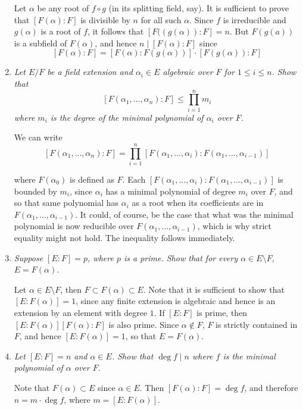 \documentclass[10pt]{article}
\begin{document}
\begin{enumerate}
Let $\alpha$ be any root of $f \circ g$ (in its splitting field, say).  It is sufficient to prove that $[F(\alpha):F]$ is divisible by $n$ for all such $\alpha$.  Since $f$ is irreducible and $g(\alpha)$ is a root of $f$, it follows that $[F((g(\alpha)):F] = n$.  But $F(g(a))$ is a subfield of $F(\alpha)$, and hence $n \mid [F(\alpha):F]$ since
\[
[F(\alpha):F] = [F(\alpha):F(g(\alpha))]\cdot[F(g(\alpha)):F]
\]

\item \emph{Let $E/F$ be a field extension and $\alpha_i \in E$ algebraic over $F$ for $1 \leq i \leq n$.  Show that $$[F(\alpha_1, \ldots, \alpha_n) : F] \leq \prod_{i=1}^n m_i$$ where $m_i$ is the degree of the minimal polynomial of $\alpha_i$ over $F$.}

We can write
\[
[F(\alpha_1, \ldots, \alpha_n) : F] = \prod_{i=1}^n [F(\alpha_1, \ldots, \alpha_i):F(\alpha_1, \ldots, \alpha_{i-1})]
\]

where $F(\alpha_0)$ is defined as $F$.  Each $[F(\alpha_1, \ldots, \alpha_i):F(\alpha_1, \ldots, \alpha_{i-1})]$ is bounded by $m_i$, since $\alpha_i$ has a minimal polynomial of degree $m_i$ over $F$, and so that same polynomial has $\alpha_i$ as a root when its coefficients are in $F(\alpha_1, \ldots, \alpha_{i-1})$.  It could, of course, be the case that what was the minimal polynomial is now reducible over $F(\alpha_1, \ldots, \alpha_{i-1})$, which is why strict equality might not hold.  The inequality follows immediately.

\item \emph{Suppose $[E:F] = p$, where $p$ is a prime.  Show that for every $\alpha \in E \setminus F$, $E = F(\alpha)$.}

Let $\alpha \in E \setminus F$, then $F \subset F(\alpha) \subset E$.  Note that it is sufficient to show that $[E:F(\alpha)] = 1$, since any finite extension is algebraic and hence is an extension by an element with degree $1$.  If $[E:F]$ is prime, then $[E:F(\alpha)][F(\alpha):F]$ is also prime.  Since $\alpha \notin F$, $F$ is strictly contained in $F$, and hence $[E:F(\alpha)] = 1$, so that $E = F(\alpha)$.

\item \emph{Let $[E:F] = n$ and $\alpha \in E$.  Show that $\deg f \mid n$ where $f$ is the minimal polynomial of $\alpha$ over $F$.}

Note that $F(\alpha) \subset E$ since $\alpha \in E$.  Then  $[F(\alpha) : F] = \deg f$, and therefore $n = m \cdot \deg f$, where $m = [E:F(\alpha)]$.


\end{enumerate}
\end{document}
